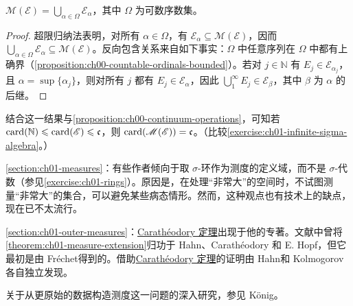 \documentclass[../../main.tex]{subfiles}%
\begin{document}
\begin{proposition}\label{proposition:ch01-transfinite-sigma-generation}
$\mathscr{M}(\mathscr{E})=\bigcup_{\alpha\in\Omega}\mathscr{E}_\alpha$，其中 $\Omega$ 为可数序数集。
\end{proposition}

\begin{proof}
超限归纳法表明，对所有 $\alpha\in\Omega$，有 $\mathscr{E}_\alpha\subseteq\mathscr{M}(\mathscr{E})$，因而 $\bigcup_{\alpha\in\Omega}\mathscr{E}_\alpha\subseteq\mathscr{M}(\mathscr{E})$。反向包含关系来自如下事实：$\Omega$ 中任意序列在 $\Omega$ 中都有上确界（\cref{proposition:ch00-countable-ordinals-bounded}）。若对 $j\in\mathbb{N}$ 有 $E_j\in\mathscr{E}_{\alpha_j}$，且 $\alpha=\sup\{\alpha_j\}$，则对所有 $j$ 都有 $E_j\in\mathscr{E}_\alpha$，因此 $\bigcup_1^\infty E_j\in\mathscr{E}_\beta$，其中 $\beta$ 为 $\alpha$ 的后继。
\end{proof}

结合这一结果与\cref{proposition:ch00-continuum-operations}，可知若 $\operatorname{card}(\mathbb{N})\leqslant\operatorname{card}(\mathscr{E})\leqslant\mathfrak{c}$，则 $\operatorname{card}(\mathscr{M}(\mathscr{E}))=\mathfrak{c}$。（比较\cref{exercise:ch01-infinite-sigma-algebra}。）

\cref{section:ch01-measures}：有些作者倾向于取 $\sigma$-环作为测度的定义域，而不是 $\sigma$-代数（参见\cref{exercise:ch01-rings}）。原因是，在处理“非常大”的空间时，不试图测量“非常大”的集合，可以避免某些病态情形。然而，这种观点也有技术上的缺点，现在已不太流行。

\cref{section:ch01-outer-measures}：\hyperref[theorem:ch01-caratheodory]{Carathéodory 定理}出现于他的专著\cite{folland-bib-022}。文献中曾将\cref{theorem:ch01-measure-extension}归功于 Hahn、Carathéodory 和 E. Hopf，但它最初是由 Fréchet\cite{folland-bib-054}得到的。借助\hyperref[theorem:ch01-caratheodory]{Carathéodory 定理}的证明由 Hahn\cite{folland-bib-060}和 Kolmogorov\cite{folland-bib-085}各自独立发现。

关于从更原始的数据构造测度这一问题的深入研究，参见 König\cite{folland-bib-086}。
\end{document}
